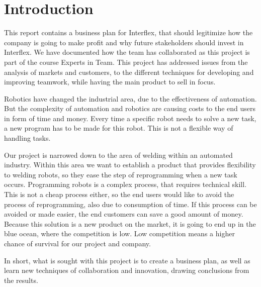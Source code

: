 \section{Introduction}

This report contains a business plan for Interflex, that should legitimize how the company is going to make profit and why future stakeholders should invest in Interflex. 
We have documented how the team has collaborated as this project is part of the course Experts in Team.
This project has addressed issues from the analysis of markets and customers, to the different techniques for developing and improving teamwork, while having the main product to sell in focus.

Robotics have changed the industrial area, due to the effectiveness of automation. But the complexity of automation and robotics are causing costs to the end users in form of time and money. Every time a specific robot needs to solve a new task, a new program has to be made for this robot. This is not a flexible way of handling tasks. 

Our project is narrowed down to the area of welding within an automated industry. Within this area we want to establish a product that provides flexibility to welding robots, so they ease the step of reprogramming when a new task occurs. Programming robots is a complex process, that requires technical skill. This is not a cheap process either, so the end users would like to avoid the process of reprogramming, also due to consumption of time. If this process can be avoided or made easier, the end customers can save a good amount of money. Because this solution is a new product on the market, it is going to end up in the blue ocean, where the competition is low. Low competition means a higher chance of survival for our project and company.

In short, what is sought with this project is to create a business plan, as well as learn new techniques of collaboration and innovation, drawing conclusions from the results.
